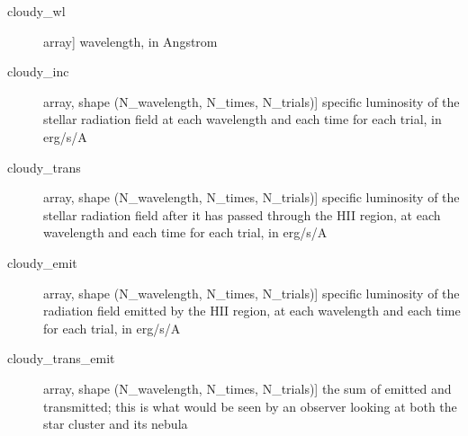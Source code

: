 \documentclass[letterpaper,10pt,english]{sphinxmanual}
\begin{document}
\begin{fulllineitems}
\begin{description}
\begin{description}
\item[{cloudy\_wl}] \leavevmode{[}array{]}
wavelength, in Angstrom

\item[{cloudy\_inc}] \leavevmode{[}array, shape (N\_wavelength, N\_times, N\_trials){]}
specific luminosity of the stellar radiation field at each
wavelength and each time for each trial, in erg/s/A

\item[{cloudy\_trans}] \leavevmode{[}array, shape (N\_wavelength, N\_times, N\_trials){]}
specific luminosity of the stellar radiation field after it has
passed through the HII region, at each wavelength and each time
for each trial, in erg/s/A

\item[{cloudy\_emit}] \leavevmode{[}array, shape (N\_wavelength, N\_times, N\_trials){]}
specific luminosity of the radiation field emitted by the HII
region, at each wavelength and each time for each trial, in
erg/s/A

\item[{cloudy\_trans\_emit}] \leavevmode{[}array, shape (N\_wavelength, N\_times, N\_trials){]}
the sum of emitted and transmitted; this is what would be seen
by an observer looking at both the star cluster and its nebula

\end{description}

\end{description}

\end{fulllineitems}

\end{document}
